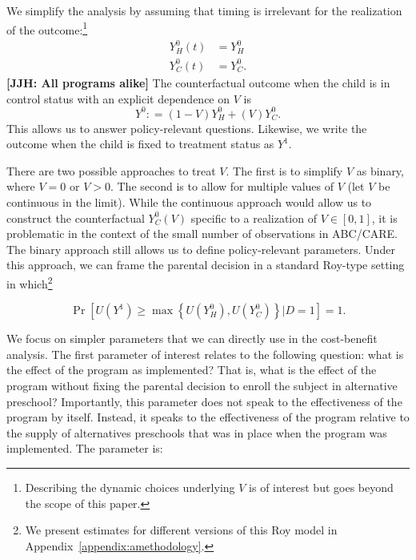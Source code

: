 We simplify the analysis by assuming that timing is irrelevant for the realization of the outcome:\footnote{Describing the dynamic choices underlying $V$ is of interest but goes beyond the scope of this paper.}
\begin{align}
Y_H^0 \left( t \right) &= Y_H^0 \nonumber \\
Y_C^0 \left( t \right) &= Y_C^0.
\end{align}
\textbf{[JJH: All programs alike]} The counterfactual outcome when the child is in control status with an explicit dependence on $V$ is
\begin{equation}
Y^0 : = \left( 1 - V \right) Y_H^0 + \left( V \right) Y_C^0.
\end{equation}
This allows us to answer policy-relevant questions. Likewise, we write the outcome when the child is fixed to treatment status as $Y^1$.

There are two possible approaches to treat $V$. The first is to simplify $V$ as binary, where $V = 0$ or $V  > 0$. The second is to allow for multiple values of $V$ (let $V$ be continuous in the limit). While the continuous approach would allow us to construct the counterfactual $Y_C^0 \left( V \right)$ specific to a realization of $V \in [0,1]$, it is problematic in the context of the small number of observations in ABC/CARE. The binary approach still allows us to define policy-relevant parameters. Under this approach, we can frame the parental decision in a standard Roy-type setting in which\footnote{We present estimates for different versions of this Roy model in Appendix~\ref{appendix:amethodology}.}

\begin{equation}
\Pr \left[ U \left(Y^1 \right) \geq  \max \left\{ U \left(  Y_{H}^0 \right),  U\left(Y_{C}^0 \right) \right\} \vert D =  1\right] = 1.
\label{eq:noutility}
\end{equation}

We focus on simpler parameters that we can directly use in the cost-benefit analysis. The first parameter of interest relates to the following question: what is the effect of the program as implemented? That is, what is the effect of the program without fixing the parental decision to enroll the subject in alternative preschool? Importantly, this parameter does not speak to the effectiveness of the program by itself. Instead, it speaks to the effectiveness of the program relative to the supply of alternatives preschools that was in place when the program was implemented. The parameter is:


